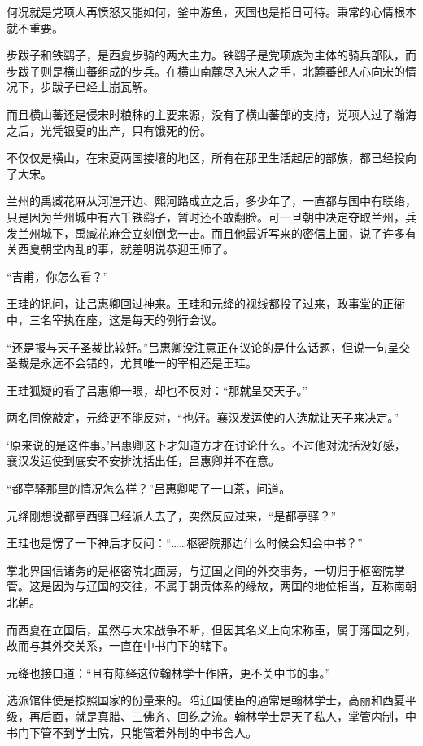 何况就是党项人再愤怒又能如何，釜中游鱼，灭国也是指日可待。秉常的心情根本就不重要。

步跋子和铁鹞子，是西夏步骑的两大主力。铁鹞子是党项族为主体的骑兵部队，而步跋子则是横山蕃组成的步兵。在横山南麓尽入宋人之手，北麓蕃部人心向宋的情况下，步跋子已经土崩瓦解。

而且横山蕃还是侵宋时粮秣的主要来源，没有了横山蕃部的支持，党项人过了瀚海之后，光凭银夏的出产，只有饿死的份。

不仅仅是横山，在宋夏两国接壤的地区，所有在那里生活起居的部族，都已经投向了大宋。

兰州的禹臧花麻从河湟开边、熙河路成立之后，多少年了，一直都与国中有联络，只是因为兰州城中有六千铁鹞子，暂时还不敢翻脸。可一旦朝中决定夺取兰州，兵发兰州城下，禹臧花麻会立刻倒戈一击。而且他最近写来的密信上面，说了许多有关西夏朝堂内乱的事，就差明说恭迎王师了。

“吉甫，你怎么看？”

王珪的讯问，让吕惠卿回过神来。王珪和元绛的视线都投了过来，政事堂的正衙中，三名宰执在座，这是每天的例行会议。

“还是报与天子圣裁比较好。”吕惠卿没注意正在议论的是什么话题，但说一句呈交圣裁是永远不会错的，尤其唯一的宰相还是王珪。

王珪狐疑的看了吕惠卿一眼，却也不反对：“那就呈交天子。”

两名同僚敲定，元绛更不能反对，“也好。襄汉发运使的人选就让天子来决定。”

‘原来说的是这件事。’吕惠卿这下才知道方才在讨论什么。不过他对沈括没好感，襄汉发运使到底安不安排沈括出任，吕惠卿并不在意。

“都亭驿那里的情况怎么样？”吕惠卿喝了一口茶，问道。

元绛刚想说都亭西驿已经派人去了，突然反应过来，“是都亭驿？”

王珪也是愣了一下神后才反问：“……枢密院那边什么时候会知会中书？”

掌北界国信诸务的是枢密院北面房，与辽国之间的外交事务，一切归于枢密院掌管。这是因为与辽国的交往，不属于朝贡体系的缘故，两国的地位相当，互称南朝北朝。

而西夏在立国后，虽然与大宋战争不断，但因其名义上向宋称臣，属于藩国之列，故而与其外交关系，一直在中书门下的辖下。

元绛也接口道：“且有陈绎这位翰林学士作陪，更不关中书的事。”

选派馆伴使是按照国家的份量来的。陪辽国使臣的通常是翰林学士，高丽和西夏平级，再后面，就是真腊、三佛齐、回纥之流。翰林学士是天子私人，掌管内制，中书门下管不到学士院，只能管着外制的中书舍人。

